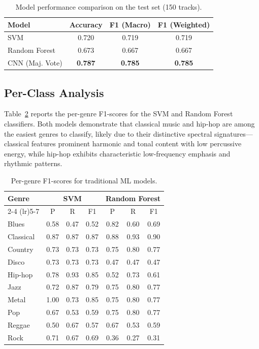 \documentclass[10pt,journal]{IEEEtran}
\begin{document}
\begin{table}[ht]
\centering
\caption{Model performance comparison on the test set (150 tracks).}
\label{tab:comparison}
\begin{tabular}{@{}lccc@{}}
\toprule
\textbf{Model} & \textbf{Accuracy} & \textbf{F1 (Macro)} & \textbf{F1 (Weighted)} \\
\midrule
SVM             & 0.720 & 0.719 & 0.719 \\
Random Forest   & 0.673 & 0.667 & 0.667 \\
CNN (Maj. Vote) & \textbf{0.787} & \textbf{0.785} & \textbf{0.785} \\
\bottomrule
\end{tabular}
\end{table}

\subsection{Per-Class Analysis}

Table~\ref{tab:perclass} reports the per-genre F1-scores for the SVM and Random Forest classifiers. Both models demonstrate that classical music and hip-hop are among the easiest genres to classify, likely due to their distinctive spectral signatures---classical features prominent harmonic and tonal content with low percussive energy, while hip-hop exhibits characteristic low-frequency emphasis and rhythmic patterns.

\begin{table}[ht]
\centering
\caption{Per-genre F1-scores for traditional ML models.}
\label{tab:perclass}
\begin{tabular}{@{}lcccccc@{}}
\toprule
\textbf{Genre} & \multicolumn{3}{c}{\textbf{SVM}} & \multicolumn{3}{c}{\textbf{Random Forest}} \\
\cmidrule(lr){2-4} \cmidrule(lr){5-7}
 & P & R & F1 & P & R & F1 \\
\midrule
Blues     & 0.58 & 0.47 & 0.52 & 0.82 & 0.60 & 0.69 \\
Classical & 0.87 & 0.87 & 0.87 & 0.88 & 0.93 & 0.90 \\
Country   & 0.73 & 0.73 & 0.73 & 0.75 & 0.80 & 0.77 \\
Disco     & 0.73 & 0.73 & 0.73 & 0.47 & 0.47 & 0.47 \\
Hip-hop   & 0.78 & 0.93 & 0.85 & 0.52 & 0.73 & 0.61 \\
Jazz      & 0.72 & 0.87 & 0.79 & 0.75 & 0.80 & 0.77 \\
Metal     & 1.00 & 0.73 & 0.85 & 0.75 & 0.80 & 0.77 \\
Pop       & 0.67 & 0.53 & 0.59 & 0.75 & 0.80 & 0.77 \\
Reggae    & 0.50 & 0.67 & 0.57 & 0.67 & 0.53 & 0.59 \\
Rock      & 0.71 & 0.67 & 0.69 & 0.36 & 0.27 & 0.31 \\
\bottomrule
\end{tabular}
\end{table}
\end{document}
